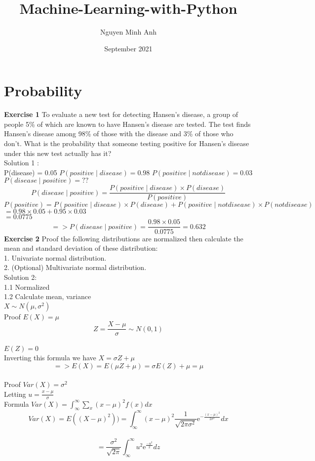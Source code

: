 \documentclass{article}
\title{Machine-Learning-with-Python}
\author{Nguyen Minh Anh}
\date{September 2021}
\begin{document}
\maketitle

\section{Probability}

\textbf{Exercise 1}
To evaluate a new test for detecting Hansen’s disease, a group of people 5\% of which are known to have Hansen’s disease are tested. The test finds Hansen’s disease among 98\% of those with the disease and 3\% of those who don’t. What is the probability that someone testing positive for Hansen’s disease under this new test actually has it? \\
Solution 1 : \\
P(disease) = 0.05 \newline
$P(positive \mid disease) = 0.98$ \newline
$P(positive \mid not disease) = 0.03$ \newline
$P(disease \mid positive) = ??$ \\
$$ P(disease \mid positive) = \frac{P(positive \mid disease) \times P(disease)}{P(positive)} $$
$P(positive) =  P(positive \mid disease) \times P(disease) + P(positive \mid not disease) \times P(not disease)$ \\
$            = 0.98 \times 0.05 + 0.95 \times 0.03$ \\
$            = 0.0775$
$$ => P(disease \mid positive) = \frac{0.98 \times 0.05}{0.0775} = 0.632$$
\textbf{Exercise 2} Proof the following distributions are normalized then calculate the mean and standard deviation of these distribution:\\
1. Univariate normal distribution.\\
2. (Optional) Multivariate normal distribution.\\
Solution 2: \\
1.1 Normalized \\
1.2 Calculate mean, variance \\
$X \sim N(\mu, \sigma^2)$\\ 
Proof $E(X) = \mu$ \\
$$ Z = \frac{X - \mu}{\sigma} \sim N(0,1)$$\\
$E(Z) = 0$\\
Inverting this formula we have $X = \sigma Z + \mu$\\
$$=> E(X) = E(\mu Z + \mu) = \sigma E(Z) + \mu = \mu$$\\
Proof $Var(X) = \sigma ^2$\\
Letting $u = \frac{x-\mu}{\sigma}$\\
Formula $Var(X) = \int_\infty^\infty \sum_{x}(x- \mu)^2 f(x) dx$
$$Var(X) = E((X - \mu)^2)) =\int_\infty^\infty (x-\mu)^2 \frac{1}{\sqrt{2\pi\sigma^2}} \mathrm{e}^{-\frac{(x-\mu)^2}{2\sigma^2}} dx $$\\
$$       = \frac{\sigma^2}{\sqrt{2 \pi}} \int_\infty^\infty u^2 \mathrm{e}^{\frac{-u^2}{2}} dz $$
\end{document}
